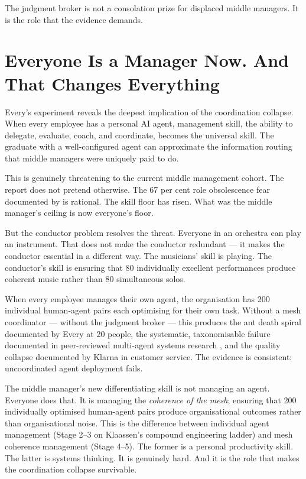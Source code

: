 The judgment broker is not a consolation prize for displaced middle managers. It is the role that the evidence demands.

\section{Everyone Is a Manager Now. And That Changes Everything}

Every's experiment \parencite{Shipper2026} reveals the deepest implication of the coordination collapse. When every employee has a personal AI agent, management skill, the ability to delegate, evaluate, coach, and coordinate, becomes the universal skill. The graduate with a well-configured agent can approximate the information routing that middle managers were uniquely paid to do.

This is genuinely threatening to the current middle management cohort. The report does not pretend otherwise. The 67 per cent role obsolescence fear documented by \textcite{Capgemini2025} is rational. The skill floor has risen. What was the middle manager's ceiling is now everyone's floor.

But the conductor problem resolves the threat. Everyone in an orchestra can play an instrument. That does not make the conductor redundant --- it makes the conductor essential in a different way. The musicians' skill is playing. The conductor's skill is ensuring that 80 individually excellent performances produce coherent music rather than 80 simultaneous solos.

When every employee manages their own agent, the organisation has 200 individual human-agent pairs each optimising for their own task. Without a mesh coordinator --- without the judgment broker --- this produces the ant death spiral documented by Every at 20 people, the systematic, taxonomisable failure documented in peer-reviewed multi-agent systems research \parencite{Cemri2025}, and the quality collapse documented by Klarna in customer service. The evidence is consistent: uncoordinated agent deployment fails.

The middle manager's new differentiating skill is not managing an agent. Everyone does that. It is managing the \emph{coherence of the mesh}; ensuring that 200 individually optimised human-agent pairs produce organisational outcomes rather than organisational noise. This is the difference between individual agent management (Stage 2--3 on Klaassen's compound engineering ladder) and mesh coherence management (Stage 4--5). The former is a personal productivity skill. The latter is systems thinking. It is genuinely hard. And it is the role that makes the coordination collapse survivable.

